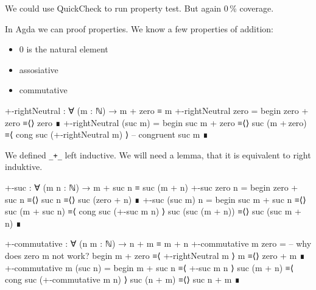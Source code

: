We could use QuickCheck to run property test. But again 0\,\% coverage.

In Agda we can proof properties. We know a few properties of addition:
\begin{itemize}
  \item $0$ is the natural element
  \item assosiative
  \item commutative
\end{itemize}

\begin{code}
+-rightNeutral : ∀ (m : ℕ) → m + zero ≡ m
+-rightNeutral zero =
  begin
    zero + zero
  ≡⟨⟩
    zero
  ∎
+-rightNeutral (suc m) =
  begin
    suc m + zero
  ≡⟨⟩
    suc (m + zero)
  ≡⟨ cong  suc (+-rightNeutral m) ⟩ -- congruent
    suc m
  ∎
\end{code}

We defined \verb=_+_= left inductive. We will need a lemma, that
it is equivalent to right induktive.
\begin{code}
+-suc : ∀ (m n : ℕ) → m + suc n ≡ suc (m + n)
+-suc zero n =
  begin
    zero + suc n
  ≡⟨⟩
    suc n
  ≡⟨⟩
    suc (zero + n)
  ∎
+-suc (suc m) n =
  begin
    suc m + suc n
  ≡⟨⟩
    suc (m + suc n)
  ≡⟨ cong suc (+-suc m n) ⟩
    suc (suc (m + n))
  ≡⟨⟩
    suc (suc m + n)
  ∎
\end{code}

\begin{code}
+-commutative : ∀ (n m : ℕ) → n + m ≡ m + n
+-commutative m zero = -- why does zero m not work?
  begin
    m + zero
  ≡⟨ +-rightNeutral m ⟩
    m
  ≡⟨⟩
    zero + m
  ∎
+-commutative m (suc n) =
  begin
    m + suc n
  ≡⟨ +-suc m n ⟩
    suc (m + n)
  ≡⟨ cong suc (+-commutative m n) ⟩
    suc (n + m)
  ≡⟨⟩
    suc n + m
  ∎
\end{code}
